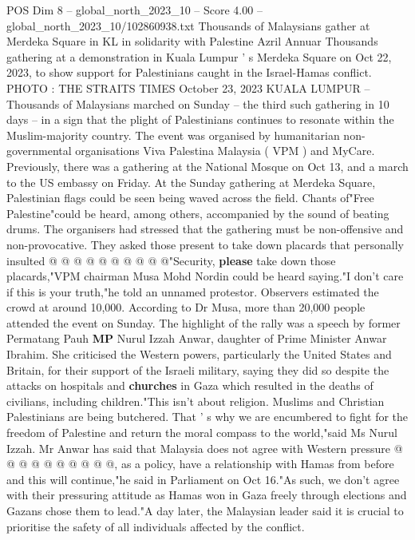 \begin{textsample}{POS Dim 8 – global\_north\_2023\_10 – Score 4.00 – global\_north\_2023\_10/102860938.txt}  \label{ex:f8_pos_208}
Thousands of Malaysians gather at Merdeka Square in KL in solidarity with Palestine Azril Annuar Thousands gathering at a demonstration in Kuala Lumpur ' s Merdeka Square on Oct 22, 2023, to show support for Palestinians caught in the Israel-Hamas conflict.
PHOTO : THE STRAITS TIMES October 23, 2023 KUALA LUMPUR -- Thousands of Malaysians marched on Sunday -- the third such gathering in 10 days -- in a sign that the plight of Palestinians continues to resonate within the Muslim-majority country.
The event was organised by humanitarian non-governmental organisations Viva Palestina Malaysia ( VPM ) and MyCare.
Previously, there was a gathering at the National Mosque on Oct 13, and a march to the US embassy on Friday.
At the Sunday gathering at Merdeka Square, Palestinian flags could be seen being waved across the field.
Chants of"Free Palestine"could be heard, among others, accompanied by the sound of beating drums.
The organisers had stressed that the gathering must be non-offensive and non-provocative.
They asked those present to take down placards that personally insulted @ @ @ @ @ @ @ @ @ @"Security, \textbf{please} take down those placards,"VPM chairman Musa Mohd Nordin could be heard saying."I don't care if this is your truth,"he told an unnamed protestor.
Observers estimated the crowd at around 10,000.
According to Dr Musa, more than 20,000 people attended the event on Sunday.
The highlight of the rally was a speech by former Permatang Pauh \textbf{MP} Nurul Izzah Anwar, daughter of Prime Minister Anwar Ibrahim.
She criticised the Western powers, particularly the United States and Britain, for their support of the Israeli military, saying they did so despite the attacks on hospitals and \textbf{churches} in Gaza which resulted in the deaths of civilians, including children."This isn't about religion.
Muslims and Christian Palestinians are being butchered.
That ' s why we are encumbered to fight for the freedom of Palestine and return the moral compass to the world,"said Ms Nurul Izzah.
Mr Anwar has said that Malaysia does not agree with Western pressure @ @ @ @ @ @ @ @ @ @, as a policy, have a relationship with Hamas from before and this will continue,"he said in Parliament on Oct 16."As such, we don't agree with their pressuring attitude as Hamas won in Gaza freely through elections and Gazans chose them to lead."A day later, the Malaysian leader said it is crucial to prioritise the safety of all individuals affected by the conflict.

\end{textsample}
